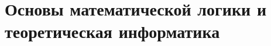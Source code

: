 \documentclass[../../book-ru.tex]{subfiles}
\begin{document}
\chapter{Основы математической логики и теоретическая информатика}
\label{ch:2.3a-logic-tcs-ru}















\end{document}
